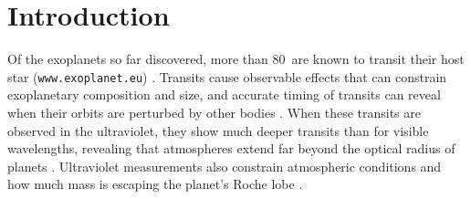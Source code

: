 \documentclass[manuscript]{aastex}
\newcommand{\numt}{80}
\begin{document}


\section{Introduction}
Of the exoplanets so far discovered, more than \numt\ are known to
transit their host star (\texttt{www.exoplanet.eu}) . Transits cause observable effects that can constrain exoplanetary composition and size, and accurate timing of transits can reveal when their orbits are perturbed by other bodies \citep{winnchap}. When these transits are observed in the ultraviolet, they show much deeper transits than for visible wavelengths, revealing that atmospheres extend far beyond the optical radius of planets \citep{vidmad,benjaf7,mclay,lecav,fossati}. Ultraviolet measurements also constrain atmospheric conditions and how much mass is escaping the planet's Roche lobe \citep{knutsonprop,gmunoz,linsky}.
\end{document}
